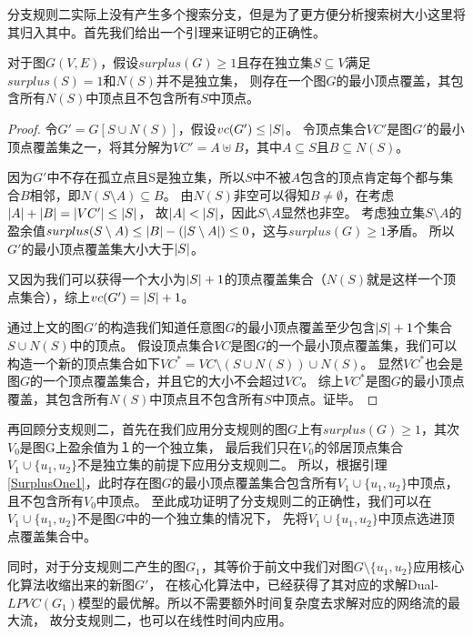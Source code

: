 分支规则二实际上没有产生多个搜索分支，但是为了更方便分析搜索树大小这里将其归入其中。首先我们给出一个引理来证明它的正确性。
\begin{lemma} \label{SurplusOne1}
对于图$G(V, E)$，假设$surplus(G) \ge 1$且存在独立集$S \subseteq V$满足$surplus(S) = 1$和$N(S)$并不是独立集，
则存在一个图$G$的最小顶点覆盖，其包含所有$N(S)$中顶点且不包含所有$S$中顶点。
\end{lemma}
\begin{proof}
令$G' = G[S \cup N(S)]$，假设$vc(G')\le \left\vert S \right\vert$。
令顶点集合$VC'$是图$G'$的最小顶点覆盖集之一，将其分解为$VC' = A \uplus B$，其中$A \subseteq S$且$B \subseteq N(S)$。

因为$G'$中不存在孤立点且S是独立集，所以$S$中不被$A$包含的顶点肯定每个都与集合$B$相邻，即$N(S \setminus A) \subseteq B$。
由$N(S)$非空可以得知$B \neq \emptyset$，在考虑$\left\vert A \right\vert + \left\vert B \right\vert = \left\vert VC' \right\vert \le \left\vert S \right\vert$，
故$\left\vert A \right\vert < \left\vert S \right\vert$，因此$S \setminus A$显然也非空。
考虑独立集$S \setminus A$的盈余值$surplus(S \setminus A) \le \left\vert B \right\vert - (\left\vert S \setminus A \right\vert) \le 0$，这与$surplus(G) \ge 1$矛盾。
所以$G'$的最小顶点覆盖集大小大于$\left\vert S \right\vert$。

又因为我们可以获得一个大小为$\left\vert S \right\vert + 1$的顶点覆盖集合（$N(S)$就是这样一个顶点集合），综上$vc(G') = \left\vert S \right\vert + 1$。

通过上文的图$G'$的构造我们知道任意图$G$的最小顶点覆盖至少包含$\left\vert S \right\vert + 1$个集合$S \cup N(S)$中的顶点。
假设顶点集合$VC$是图$G$的一个最小顶点覆盖集，我们可以构造一个新的顶点集合如下$VC^* = VC \setminus (S \cup N(S)) \cup N(S)$。
显然$VC^*$也会是图$G$的一个顶点覆盖集合，并且它的大小不会超过$VC$。
综上$VC^*$是图$G$的最小顶点覆盖，其包含所有$N(S)$中顶点且不包含所有$S$中顶点。证毕。
\end{proof}

再回顾分支规则二，首先在我们应用分支规则的图$G$上有$surplus(G) \ge 1$，其次$V_0$是图G上盈余值为１的一个独立集，
最后我们只在$V_0$的邻居顶点集合$V_1 \cup \{u_1, u_2\}$不是独立集的前提下应用分支规则二。
所以，根据引理\ref{SurplusOne1}，此时存在图$G$的最小顶点覆盖集合包含所有$V_1 \cup \{u_1, u_2\}$中顶点，且不包含所有$V_0$中顶点。
至此成功证明了分支规则二的正确性，我们可以在$V_1 \cup \{u_1, u_2\}$不是图$G$中的一个独立集的情况下，
先将$V_1 \cup \{u_1, u_2\}$中顶点选进顶点覆盖集合中。

同时，对于分支规则二产生的图$G_1$，其等价于前文中我们对图$G \setminus \{u_1, u_2\}$应用核心化算法收缩出来的新图$G'$，
在核心化算法中，已经获得了其对应的求解Dual-$LPVC(G_1)$模型的最优解。所以不需要额外时间复杂度去求解对应的网络流的最大流，
故分支规则二，也可以在线性时间内应用。

